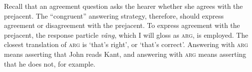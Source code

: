 \documentclass[output=paper,colorlinks,citecolor=brown]{langscibook}
\begin{document}



 
Recall that an agreement question asks the hearer whether she agrees with the prejacent. The ``congruent'' answering strategy, therefore, should express agreement or disagreement with the prejacent. To express agreement with the prejacent, the response particle \textit{vâng}, which I will gloss as \textsc{arg}, is employed. The closest translation of \textsc{arg} is `that's right', or `that's correct'. Answering  with \textsc{arg} means asserting that John reads Kant, and answering  with \textsc{arg} means asserting that he does not, for example. 




\end{document}
